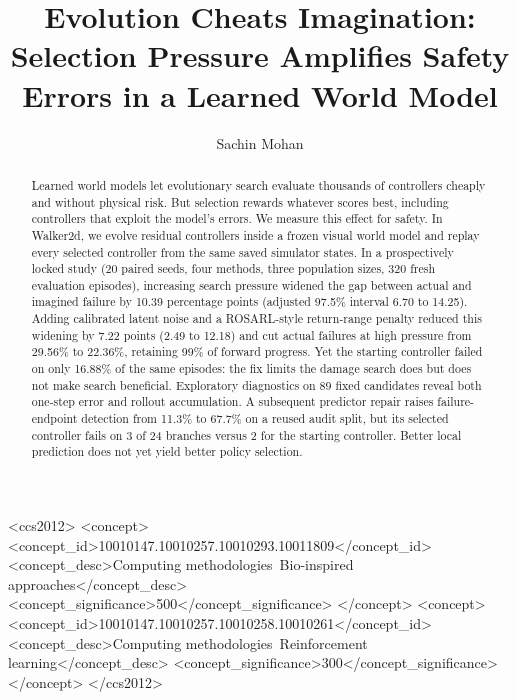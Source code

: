 \documentclass[sigconf,dvipsnames]{acmart}
\newcommand{\rosarl}{ROSARL}
\begin{document}
\title{Evolution Cheats Imagination: Selection Pressure Amplifies Safety Errors in a Learned World Model}

\author{Sachin Mohan}
\renewcommand{\shortauthors}{Mohan}

\begin{abstract}
Learned world models let evolutionary search evaluate thousands of controllers
cheaply and without physical risk. But selection rewards whatever scores best,
including controllers that exploit the model's errors. We measure this effect
for safety. In Walker2d, we evolve residual controllers inside a frozen visual
world model and replay every selected controller from the same saved simulator
states. In a prospectively locked study (20 paired seeds, four methods, three
population sizes, 320 fresh evaluation episodes), increasing search pressure
widened the gap between actual and imagined failure by 10.39 percentage points
(adjusted 97.5\% interval 6.70 to 14.25). Adding calibrated latent noise and a
\rosarl{}-style return-range penalty reduced this widening by 7.22 points (2.49
to 12.18) and cut actual failures at high pressure from 29.56\% to 22.36\%,
retaining 99\% of forward progress. Yet the starting controller failed on only
16.88\% of the same episodes: the fix limits the damage search does but does not
make search beneficial. Exploratory diagnostics on 89 fixed candidates reveal
both one-step error and rollout accumulation. A subsequent predictor repair
raises failure-endpoint detection from 11.3\% to 67.7\% on a reused audit split,
but its selected controller fails on 3 of 24 branches versus 2 for the starting
controller. Better local prediction does not yet yield better policy selection.
\end{abstract}

\begin{CCSXML}
<ccs2012>
<concept>
<concept_id>10010147.10010257.10010293.10011809</concept_id>
<concept_desc>Computing methodologies~Bio-inspired approaches</concept_desc>
<concept_significance>500</concept_significance>
</concept>
<concept>
<concept_id>10010147.10010257.10010258.10010261</concept_id>
<concept_desc>Computing methodologies~Reinforcement learning</concept_desc>
<concept_significance>300</concept_significance>
</concept>
</ccs2012>
\end{CCSXML}
\end{document}
